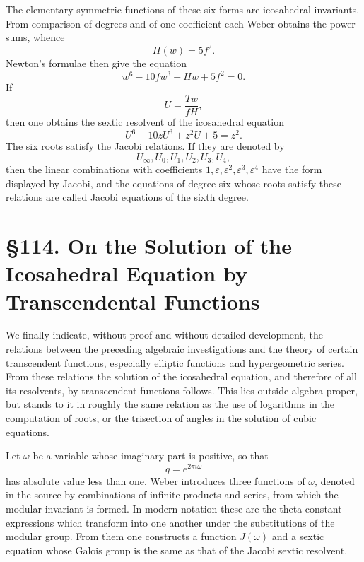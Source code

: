 \documentclass[11pt,a4paper]{book}
\newcommand{\webersection}[2]{\clearpage\section*{\S #1. #2}}
\begin{document}
The elementary symmetric functions of these six forms are icosahedral invariants.  From comparison of degrees and of one coefficient each Weber obtains the power sums, whence
\begin{equation}
 \Pi(w)=5f^2.
\end{equation}
Newton's formulae then give the equation
\begin{equation}
 w^6-10f w^3+Hw+5f^2=0.
\end{equation}
If
\begin{equation}
 U=\frac{Tw}{fH},
\end{equation}
then one obtains the sextic resolvent of the icosahedral equation
\begin{equation}
 U^6-10zU^3+z^2U+5=z^2.
\end{equation}
The six roots satisfy the Jacobi relations.  If they are denoted by
\[
 U_\infty,U_0,U_1,U_2,U_3,U_4,
\]
then the linear combinations with coefficients $1,\varepsilon,
\varepsilon^2,
\varepsilon^3,
\varepsilon^4$ have the form displayed by Jacobi, and the equations of degree six whose roots satisfy these relations are called Jacobi equations of the sixth degree.

\webersection{114}{On the Solution of the Icosahedral Equation by Transcendental Functions}

We finally indicate, without proof and without detailed development, the relations between the preceding algebraic investigations and the theory of certain transcendent functions, especially elliptic functions and hypergeometric series.  From these relations the solution of the icosahedral equation, and therefore of all its resolvents, by transcendent functions follows.  This lies outside algebra proper, but stands to it in roughly the same relation as the use of logarithms in the computation of roots, or the trisection of angles in the solution of cubic equations.

Let $\omega$ be a variable whose imaginary part is positive, so that
\begin{equation}
 q=e^{2\pi i\omega}
\end{equation}
has absolute value less than one.  Weber introduces three functions of $\omega$, denoted in the source by combinations of infinite products and series, from which the modular invariant is formed.  In modern notation these are the theta-constant expressions which transform into one another under the substitutions of the modular group.  From them one constructs a function $J(\omega)$ and a sextic equation whose Galois group is the same as that of the Jacobi sextic resolvent.
\end{document}
